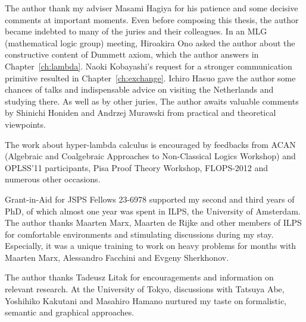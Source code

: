 \begin{acknowledge}
 The author thank my adviser Masami Hagiya for his patience and some decisive
 comments at important moments.
 Even before composing this thesis, the author became indebted to many of the
 juries and their colleagues.
 In an MLG (mathematical logic group) meeting, Hiroakira Ono asked the author
 about the constructive content of Dummett axiom, which the author answers in
 Chapter~\ref{ch:lambda}.
 Naoki Kobayashi's request for a stronger communication primitive
 resulted in Chapter~\ref{ch:exchange}.
 Ichiro Hasuo gave the author some chances of talks and
 indispensable advice on visiting the Netherlands
 and studying there.
 As well as by other juries,
 The author awaits valuable comments by Shinichi Honiden and Andrzej Murawski from
 practical and theoretical viewpoints.

 The work about hyper-lambda calculus is encouraged by feedbacks from
 ACAN (Algebraic and Coalgebraic Approaches to
 Non-Classical Logics Workshop) and OPLSS'11 participants,
 Pisa Proof Theory Workshop, FLOPS-2012
 and numerous other occasions.

 Grant-in-Aid for JSPS Fellows 23-6978 supported
 my second and third years of PhD, of which almost one year was spent
 in ILPS, the University of Amsterdam.
 The author thanks Maarten Marx, Maarten de Rijke and other members of ILPS for
 comfortable environments and stimulating discussions during my stay.
 Especially, it was a unique training to work on heavy problems for months with Maarten Marx, Alessandro
 Facchini and Evgeny Sherkhonov.

 The author thanks Tadeusz Litak for encouragements and
 information on relevant research.
 At the University of Tokyo,
 discussions with Tatsuya Abe, Yoshihiko Kakutani and Masahiro Hamano
 nurtured my taste on formalistic, semantic and graphical approaches.
\end{acknowledge}
